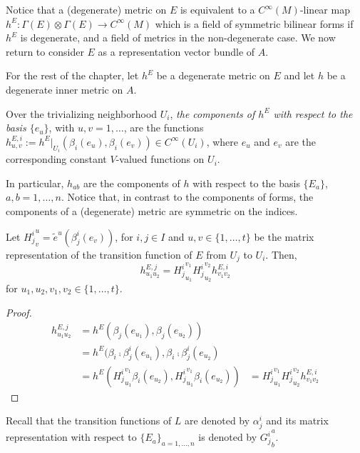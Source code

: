 Notice that a (degenerate) metric on $E$ is equivalent to a $C^\infty(M)$-linear map $h^E: \Gamma(E) \otimes \Gamma(E) \to C^\infty(M)$ which is a field of symmetric bilinear forms if $h^E$ is degenerate, and a field of metrics in the non-degenerate case. We now return to consider $E$ as a representation vector bundle of $A$.

For the rest of the chapter, let $h^E$ be a degenerate metric on $E$ and let $h$ be a degenerate inner metric on $A$.

\begin{definition}
    Over the trivializing neighborhood $U_i$, \emph{the components of $h^E$ with respect to the basis $\{e_u\}$}, with $u, v = 1, \dots$, are the functions $h^{E, i}_{u, v}:= h^E|_{U_i}(\beta_i(e_u),\beta_i(e_v)) \in C^\infty(U_i)$, where $e_u$ and $e_v$ are the corresponding constant $V$-valued functions on $U_i$.
\end{definition}

In particular, $h_{ab}$ are the components of $h$ with respect to the basis $\{E_a\}$, $a, b = 1, \dots, n$. Notice that, in contrast to the components of forms, the components of a (degenerate) metric are symmetric on the indices.

\begin{proposition}
Let ${H^i_j}^u_v = \tilde e^u(\beta^i_j(e_v))$, for $i, j \in I$ and $u, v \in \{1, \dots, t\}$ be the matrix representation of the transition function of $E$ from $U_j$ to $U_i$. Then,
\begin{equation}
    h^{E, j}_{u_1 u_2} = {H^i_j}^{v_1}_{u_1}{H^i_j}^{v_2}_{u_2} h^{E, i}_{v_1 v_2}
\end{equation}
for $u_1, u_2, v_1, v_2 \in \{1, \dots, t\}$.
\end{proposition}
\begin{proof}
\begin{align*}
    h^{E, j}_{u_1 u_2} 
        &= h^E(\beta_j(e_{u_1}),\beta_j(e_{u_2})) \\
        &= h^E(\beta_i \comp \beta^i_j(e_{u_1}), \beta_i \comp \beta^i_j(e_{u_2})\\
        &= h^E({H^i_j}^{v_1}_{u_1} \beta_i(e_{u_2}), {H^i_j}^{v_1}_{u_1} \beta_i(e_{u_2}))
        &= {H^i_j}^{v_1}_{u_1}{H^i_j}^{v_2}_{u_2} h^{E, i}_{v_1 v_2}
\end{align*}
\end{proof}
Recall that the transition functions of $L$ are denoted by $\alpha^i_j$ and its matrix representation with respect to $\{E_a\}_{a = 1, \dots, n}$ is denoted by ${G^i_j}^a_b$.


